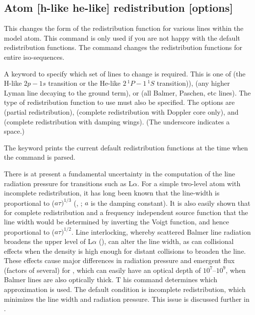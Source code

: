 \subsection{Atom [h-like \OR{} he-like]  redistribution [options]}

This changes the form of the redistribution
function for various lines within the model atom.
This command is only
used if you are not happy with the default redistribution functions.
The command changes the redistribution functions for entire iso-sequences.

A keyword to specify which set of lines to change is required.
This is one of  (the H-like $2p - 1s$ transition or the He-like
$2\, ^1P - 1\, ^1S$ transition)),  (any higher Lyman line
decaying to the ground term), or 
(all Balmer, Paschen, etc lines).
The type of redistribution function to use must also be specified.
The options are  (partial redistribution),  (complete redistribution
with Doppler core only), and 
(complete redistribution with damping wings).
(The underscore indicates a space.)

The keyword  prints the current default
redistribution functions at the time when the command is parsed.

There is at present a fundamental uncertainty in the computation of the
line radiation pressure for transitions such as L$\alpha $.
For a simple two-level
atom with incomplete redistribution, it has long been known that the
line-width is proportional to ($a\tau)^{1/3}$
(\citealp{Adams1972}, \citealp{Harrington1973}; $a$ is
the damping constant).  It is also easily shown that for complete
redistribution and a frequency independent source function that the line
width would be determined by inverting the Voigt function, and hence
proportional to ($a\tau)^{1/2}$.
Line interlocking, whereby scattered Balmer line
radiation broadens the upper level of L$\alpha$
(\citealp{Hubbard1985}), can
alter the line width, as can collisional effects when the density is high
enough for distant collisions to broaden the line.
These effects cause
major differences in radiation pressure and emergent flux (factors of
several) for \la, which can easily have an optical depth of
$10^7$--$10^9$, when
Balmer lines are also optically thick.  T
his command determines which
approximation is used.
The default condition is incomplete redistribution,
which minimizes the line width and radiation pressure.  This issue is
discussed further in \citet{Elitzur1986}.

